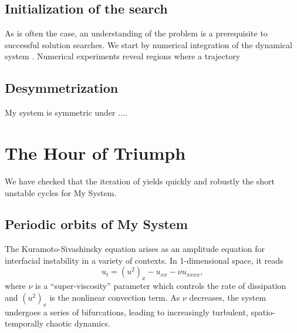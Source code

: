 \documentclass[pre,twocolumn,groupedaddress,showpacs,showkeys]{revtex4}
\begin{document}
\subsection{Initialization of the search}
\label{subsec:init}

    As is often the case, an understanding of the problem is 
a prerequisite to successful solution searches. We start by numerical 
integration of the dynamical system . Numerical experiments reveal
regions where a trajectory 

\subsection{Desymmetrization}
\label{subsec:desymm}

    My system is 
symmetric under ....

  
\section{The Hour of Triumph}
\label{sec:triumph}

    We have checked that the iteration of  yields quickly and robustly
the short unstable cycles for My System.

\subsection{Periodic orbits of My System}

   The Kuramoto-Sivashinsky equation arises as an amplitude equation
for interfacial instability in a variety of contexts. 
In 1-dimensional space, it reads
\begin{equation}
u_t=(u^2)_x-u_{xx}-\nu u_{xxxx}, \label{kseq}
\end{equation}
 where $\nu$ is a ``super-viscosity'' parameter which controls the rate of
dissipation and $(u^2)_x$ is the nonlinear convection term. 
As $\nu$ decreases, the system undergoes a series of bifurcations,
leading to increasingly turbulent, spatio-temporally chaotic dynamics.
\end{document}
